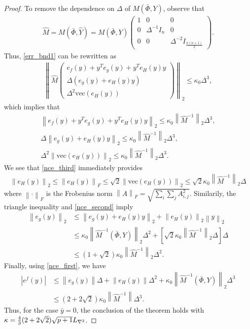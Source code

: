 \documentclass{article}
\newcommand{\matvec}{\mathrm{vec}}
\begin{document}
\begin{proof}
To remove the dependence on $\Delta$ of $M(\bar \Phi,Y)$,  observe that 
\begin{align}
\hat{M}  = M\left(\bar \Phi,  \hat{Y}\right) = M\left(\bar \Phi,Y\right) \begin{pmatrix}
1 & 0 & 0 \\
0 & \Delta^{-1} I_n & 0 \\
0 & 0 & \Delta^{-2} I_{\frac{n(n+1)}{2}}
\end{pmatrix}. \label{nce_scale}
\end{align}
Thus, \cref{err_bnd1} can be rewritten as
\begin{align*}
\left\|\hat{M}
\begin{pmatrix}
e_f(y) + y^Te_g(y) + y^Te_H(y) y \\
\Delta\left(e_g(y) + e_H(y) y\right) \\
\Delta^2 \matvec\left(e_H(y)\right)
\end{pmatrix} \right\|_2
\le \kappa_0 \Delta^3,
\end{align*}
which implies that  
\begin{align}
\left\|e_f(y) + y^Te_g(y) + y^Te_H(y) y \right\|_2\le \kappa_0 \left\|\hat M^{-1}\right\|_2 \Delta^3, \label{nce_first}\\
\Delta \left\|e_g(y) + e_H(y) y \right\|_2 \le \kappa_0 \left\|\hat M^{-1} \right\|_2  \Delta^3, \label{nce_second} \\
\Delta^2 \left\|\matvec\left(e_H(y)\right)\right\|_2 \le \kappa_0 \left\|\hat M^{-1} \right\|_2  \Delta^3. \label{nce_third}
\end{align}
We see that \cref{nce_third} immediately provides
\begin{align*}
\left\|e_H(y)\right\|_2 
\le \left\|e_H(y)\right\|_F 
\le \sqrt{2} \left\|\matvec\left(e_H(y)\right)\right\|_2
\le \sqrt{2}\kappa_0 \left\|\hat M^{-1} \right\|_2 \Delta
\end{align*}
where $\left\|\cdot\right\|_F$ is the Frobenius norm $\left\|A\right\|_F = \sqrt{\sum_i\sum_jA_{i, j}^2}$.
Similarily, the triangle inequality and \cref{nce_second} imply
\begin{align*}
\left\|e_g\left(y\right)\right\|_2 &\le \left\|e_g(y) + e_H(y) y \right\|_2 + \left\|e_H\left(y\right)\right\|_2\left\| y\right\|_2 \\
&\le \kappa_0 \left\|\hat M^{-1}(\bar \Phi, Y) \right\|_2 \Delta^2
+ \left[\sqrt{2}\kappa_0 \left\|\hat M^{-1} \right\|_2 \Delta\right]
\Delta \\
&\le\left(1 + \sqrt 2\right)\kappa_0\left\|\hat M^{-1} \right\|_2 \Delta^2.
\end{align*}
Finally, using \cref{nce_first}, we have
\begin{align*}
\left|e^f\left(y\right)\right| &\le \left\|e_g(y)\right\| \Delta + \left\|e_H(y)\right\|\Delta^2
+ \kappa_0 \left\|\hat M^{-1}(\bar \Phi, Y) \right\|_2 \Delta^3 \\
& \le \left(2 +2 \sqrt 2\right)\kappa_0 \left\|\hat M^{-1} \right\|\Delta^3.
\end{align*}
Thus, for the case $\bar{y}=0$, the conclusion of the theorem holds with $\kappa = \frac{4}{3}(2+2\sqrt{2})\sqrt{p+1} {L_{\nabla^2}}$.


\end{proof}
\end{document}
